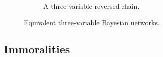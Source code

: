 \begin{figure}
\begin{subfigure}[t]{0.32\textwidth}
{}
        \caption{A three-variable reversed chain.}
        \label{fig:revchain_bayesian_net}
    \end{subfigure}
    \caption{Equivalent three-variable Bayesian networks.}
    \label{fig:equiv_bayesian_nets}
\end{figure}

\subsection{Immoralities}
\label{sec:immoralities}